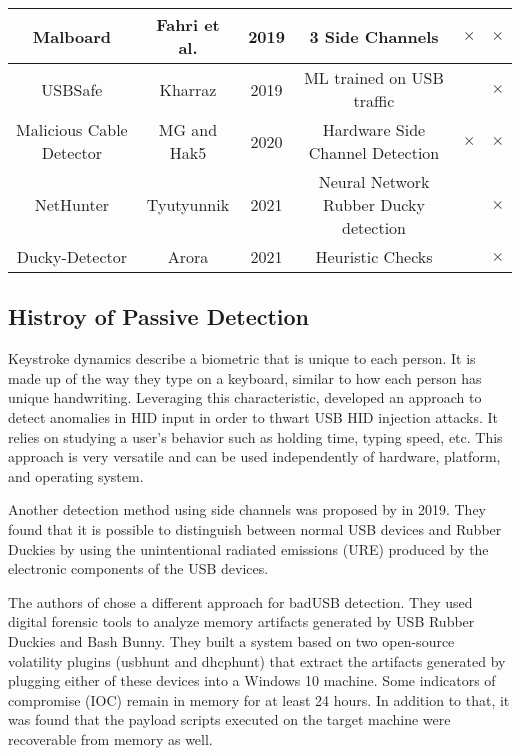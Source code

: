 {\begin{tabular}{|c c c c c c|}
 \hline
 Malboard & Fahri et al. \cite{farhiMalboardNovelUser2019} & 2019 & 3 Side Channels & $\times$ & $\times$\\
 \hline
 USBSafe & Kharraz \cite{kharrazUSBESAFEEndPointSolution2019} & 2019 & ML trained on USB traffic & & $\times$\\
 \hline
 Malicious Cable Detector & MG and Hak5 \cite{hak5MaliciousCableDetector} & 2020 & Hardware Side Channel Detection & $\times$ & $\times$ \\
 \hline
 NetHunter & Tyutyunnik \cite{IntelligentSystemPreventing} & 2021 & Neural Network Rubber Ducky detection & & $\times$\\
 \hline
 Ducky-Detector & Arora \cite{USBRubberDucky2021} & 2021 & Heuristic Checks & & $\times$\\
 \hline
\end{tabular}
}%

\subsection{Histroy of Passive Detection}


Keystroke dynamics describe a biometric that is unique to each person. It is made up of the way they type on a keyboard, similar to how each person has unique handwriting. Leveraging this characteristic, \cite{barbhuiyaAnomalyBasedApproach2012} developed an approach to detect anomalies in HID input in order to thwart USB HID injection attacks. It relies on studying a user's behavior such as holding time, typing speed, etc. This approach is very versatile and can be used independently of hardware, platform, and operating system.  

Another detection method using side channels was proposed by \cite{ibrahimRFDNAFingerprintingDetection2019} in 2019. They found that it is possible to distinguish between normal USB devices and Rubber Duckies by using the unintentional radiated emissions (URE) produced by the electronic components of the USB devices. 

The authors of \cite{thomasDuckHuntMemory2021} chose a different approach for badUSB detection. They used digital forensic tools to analyze memory artifacts generated by USB Rubber Duckies and Bash Bunny. They built a system based on two open-source volatility plugins (usbhunt and dhcphunt) that extract the artifacts generated by plugging either of these devices into a Windows 10 machine. Some indicators of compromise (IOC) remain in memory for at least 24 hours. In addition to that, it was found that the payload scripts executed on the target machine were recoverable from memory as well. 

